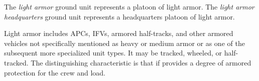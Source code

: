 
The \emph{light armor} ground unit represents a platoon of light armor. The \emph{light armor headquarters} ground unit represents a headquarters platoon of light armor.

Light armor includes APCs, IFVs, armored half-tracks, and other armored vehicles not specifically mentioned as heavy or medium armor or as one of the subsequent more specialized unit types. It may be tracked, wheeled, or half-tracked. The distinguishing characteristic is that if provides a degree of armored protection for the crew and load.
